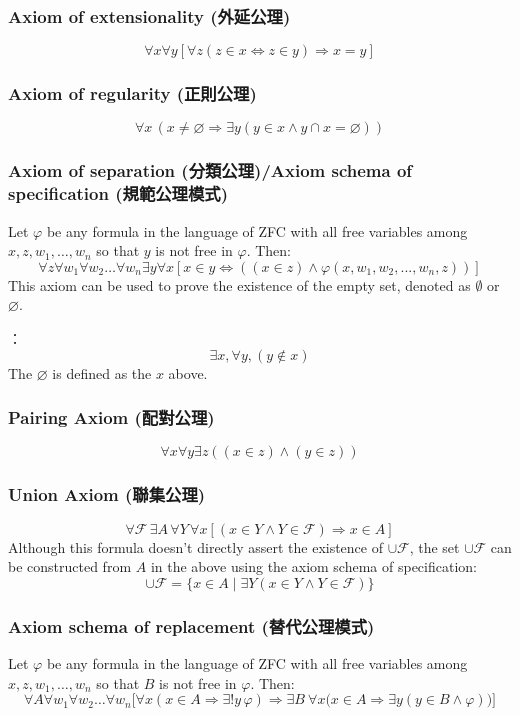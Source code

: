 \documentclass[a4paper,12pt]{article}
\begin{document}
\subsubsection{Axiom of extensionality (外延公理)}
\[\forall x\forall y[\forall z(z\in x\Leftrightarrow z\in y)\Rightarrow x=y]\]
\subsubsection{Axiom of regularity (正則公理)}
\[\forall x\,(x\neq \varnothing \Rightarrow \exists y(y\in x\land y\cap x=\varnothing ))\]
\subsubsection{Axiom of separation (分類公理)/Axiom schema of specification (規範公理模式)}
Let $\varphi$ be any formula in the language of ZFC with all free variables among $x,z,w_{1},\ldots ,w_{n}$ so that $y$ is not free in 
$\varphi$. Then:
\[\forall z\forall w_{1}\forall w_{2}\ldots \forall w_{n}\exists y\forall x[x\in y\Leftrightarrow ((x\in z)\land \varphi (x,w_{1},w_{2},...,w_{n},z))]\]
This axiom can be used to prove the existence of the empty set, denoted as $\emptyset$ or $\varnothing$.

：
\[\exists x , \forall y , (y \notin x) \]
The $\varnothing$ is defined as the $x$ above.
\subsubsection{Pairing Axiom (配對公理)}
\[ \forall x\forall y\exists z((x\in z)\land (y\in z))\]
\subsubsection{Union Axiom (聯集公理)}
\[ \forall {\mathcal {F}}\,\exists A\,\forall Y\,\forall x[(x\in Y\land Y\in {\mathcal {F}})\Rightarrow x\in A]\]
Although this formula doesn't directly assert the existence of $\cup \mathcal {F}$, the set $\cup \mathcal {F}$ can be constructed from $A$ in the above using the axiom schema of specification:
\[\cup \mathcal {F}=\{x\in A\mid\exists Y(x\in Y\land Y\in {\mathcal {F}})\}\]
\subsubsection{Axiom schema of replacement (替代公理模式)}
Let $\varphi$ be any formula in the language of ZFC with all free variables among $x,z,w_{1},\ldots ,w_{n}$ so that $B$ is not free in 
$\varphi$. Then:
\[ \forall A\forall w_{1}\forall w_{2}\ldots \forall w_{n}{\bigl [}\forall x(x\in A\Rightarrow \exists !y\,\varphi )\Rightarrow \exists B\ \forall x{\bigl (}x\in A\Rightarrow \exists y(y\in B\land \varphi ){\bigr )}{\bigr ]}\]
\end{document}
